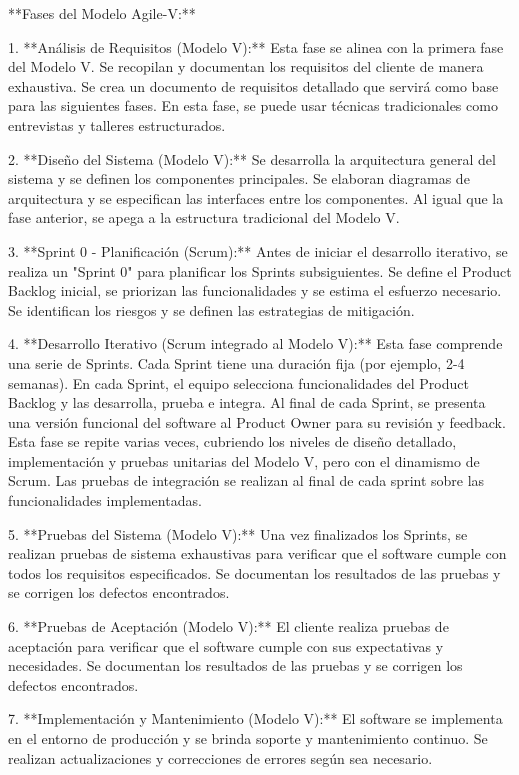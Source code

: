 \documentclass[12pt, spanish]{article}
\begin{document}
**Fases del Modelo Agile-V:**

1.  **Análisis de Requisitos (Modelo V):** Esta fase se alinea con la primera fase del Modelo V. Se recopilan y documentan los requisitos del cliente de manera exhaustiva. Se crea un documento de requisitos detallado que servirá como base para las siguientes fases. En esta fase, se puede usar técnicas tradicionales como entrevistas y talleres estructurados.

2.  **Diseño del Sistema (Modelo V):**  Se desarrolla la arquitectura general del sistema y se definen los componentes principales. Se elaboran diagramas de arquitectura y se especifican las interfaces entre los componentes. Al igual que la fase anterior, se apega a la estructura tradicional del Modelo V.

3.  **Sprint 0 - Planificación (Scrum):**  Antes de iniciar el desarrollo iterativo, se realiza un "Sprint 0" para planificar los Sprints subsiguientes.  Se define el Product Backlog inicial, se priorizan las funcionalidades y se estima el esfuerzo necesario. Se identifican los riesgos y se definen las estrategias de mitigación.

4.  **Desarrollo Iterativo (Scrum integrado al Modelo V):** Esta fase comprende una serie de Sprints. Cada Sprint tiene una duración fija (por ejemplo, 2-4 semanas). En cada Sprint, el equipo selecciona funcionalidades del Product Backlog y las desarrolla, prueba e integra. Al final de cada Sprint, se presenta una versión funcional del software al Product Owner para su revisión y feedback.  Esta fase se repite varias veces, cubriendo los niveles de diseño detallado, implementación y pruebas unitarias del Modelo V, pero con el dinamismo de Scrum. Las pruebas de integración se realizan al final de cada sprint sobre las funcionalidades implementadas.

5.  **Pruebas del Sistema (Modelo V):** Una vez finalizados los Sprints, se realizan pruebas de sistema exhaustivas para verificar que el software cumple con todos los requisitos especificados. Se documentan los resultados de las pruebas y se corrigen los defectos encontrados.

6.  **Pruebas de Aceptación (Modelo V):**  El cliente realiza pruebas de aceptación para verificar que el software cumple con sus expectativas y necesidades. Se documentan los resultados de las pruebas y se corrigen los defectos encontrados.

7.  **Implementación y Mantenimiento (Modelo V):** El software se implementa en el entorno de producción y se brinda soporte y mantenimiento continuo. Se realizan actualizaciones y correcciones de errores según sea necesario.
\end{document}
